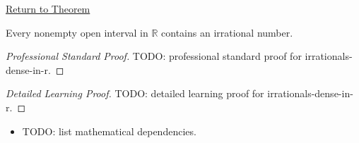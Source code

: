 \newpage
{}
\label{prf:irrationals-dense-in-r}

\begin{remark*}[Return]
\hyperref[cor:irrationals-dense-in-r]{Return to Theorem}
\end{remark*}

\begin{corollary*}
Every nonempty open interval in $\mathbb{R}$ contains an irrational number.
\end{corollary*}

\begin{proof}[Professional Standard Proof]
\LRAProofBodyStart
TODO: professional standard proof for irrationals-dense-in-r.
\end{proof}

\begin{proof}[Detailed Learning Proof]
\LRAProofBodyStart
TODO: detailed learning proof for irrationals-dense-in-r.
\end{proof}

\begin{remark*}
\end{remark*}

\begin{dependencies}
\begin{itemize}
  \item TODO: list mathematical dependencies.
\end{itemize}
\end{dependencies}

\clearpage
